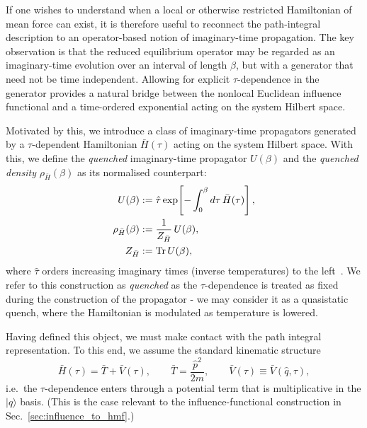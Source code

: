 If one wishes to understand when a local or otherwise restricted Hamiltonian of
mean force can exist, it is therefore useful to reconnect the path-integral
description to an operator-based notion of imaginary-time propagation. The key
observation is that the reduced equilibrium operator may be regarded as an
imaginary-time evolution over an interval of length $\beta$, but with a generator
that need not be time independent. Allowing for explicit $\tau$-dependence in
the generator provides a natural bridge between the nonlocal Euclidean influence
functional and a time-ordered exponential acting on the system Hilbert space.

Motivated by this, we introduce a class of imaginary-time propagators generated by a $\tau$-dependent Hamiltonian $\bar H(\tau)$ acting on the system Hilbert
space. With this, we define the \emph{quenched} imaginary-time propagator $U(\beta)$ and the \emph{quenched density} $\rho_{\bar H}(\beta)$ as its normalised counterpart:
\begin{equation}
\begin{split}
    U(\beta)
    &:=
    \hat\tau \exp\!\left[-\int_{0}^{\beta} d\tau\,\bar H(\tau)\right],
    \\
    \rho_{\bar H}(\beta)
    &:=
    \frac{1}{Z_{\bar H}}\, U(\beta),
    \\
    Z_{\bar H}&:=\mathrm{Tr}\, U(\beta),
\end{split}
    \label{eq:quenched_canonical_def}
\end{equation}
where $\hat\tau$ orders increasing imaginary times (inverse temperatures) to the left~\cite{feynmanQuantumMechanicsPath1965, kleinertPathIntegralsQuantum2009}. We refer to this construction as \emph{quenched} as the $\tau$-dependence is treated as fixed
during the construction of the propagator - we may consider it as a quasistatic quench, where the Hamiltonian is modulated as temperature is lowered.

Having defined this object, we must make contact with the   path integral representation. To this end, we assume the standard kinematic structure
\begin{equation}
    \bar H(\tau)=\bar T+\bar V(\tau),
    \qquad
    \bar T=\frac{\hat p^2}{2m},
    \qquad
    \bar V(\tau)\equiv \bar V(\hat q,\tau),
    \label{eq:quenched_T_plus_V}
\end{equation}
i.e.\ the $\tau$-dependence enters through a potential term that is multiplicative in the
$|q\rangle$ basis. (This is the case relevant to the influence-functional construction
in Sec.~\ref{sec:influence_to_hmf}.)

